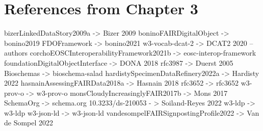 
\section{References from Chapter 3}


bizerLinkedDataStory2009a -> Bizer 2009
boninoFAIRDigitalObject -> bonino2019
FDOFramework -> bonino2021
w3-vocab-dcat-2 -> DCAT2 2020 -- authors
corchoEOSCInteroperabilityFramework2021b -> eosc-interop-framework
foundationDigitalObjectInterface -> DONA 2018
rfc3987 -> Duerst 2005
Bioschemas -> bioschema-salad
hardistySpecimenDataRefinery2022a -> Hardisty 2022
hasnainAssessingFAIRData2018a -> Hasnain 2018
rfc3652 -> rfc3652
w3-prov-o -> w3-prov-o
monsCloudyIncreasinglyFAIR2017b -> Mons 2017
SchemaOrg -> schema.org
10.3233/ds-210053 - > Soiland-Reyes 2022
w3-ldp -> w3-ldp
w3-json-ld -> w3-json-ld
vandesompelFAIRSignpostingProfile2022 -> Van de Sompel 2022

